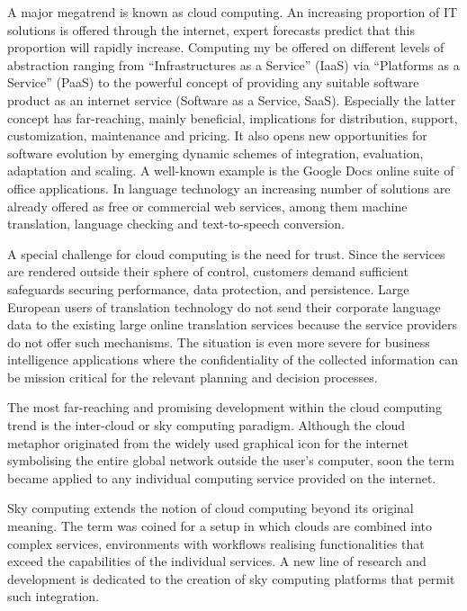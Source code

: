 \documentclass[10pt, plain]{../../metanetpaper}
\begin{document}
\begin{multicols}{2}
A major megatrend is known as cloud computing. An increasing proportion of IT solutions is offered through the internet, expert forecasts predict that this proportion will rapidly increase. Computing my be offered on different levels of abstraction ranging from “Infrastructures as a Service” (IaaS) via “Platforms as a Service” (PaaS) to the powerful concept of providing any suitable software product as an internet service (Software as a Service, SaaS). Especially the latter concept has far-reaching, mainly beneficial, implications for distribution, support, customization, maintenance and pricing. It also opens new opportunities for software evolution by emerging dynamic schemes of integration, evaluation, adaptation and scaling. A well-known example is the Google Docs online suite of office applications. In language technology an increasing number of solutions are already offered as free or commercial web services, among them machine translation, language checking and text-to-speech conversion.

A special challenge for cloud computing is the need for trust. Since the services are rendered outside their sphere of control, customers demand sufficient safeguards securing performance, data protection, and persistence. Large European users of translation technology do not send their corporate language data to the existing large online translation services because the service providers do not offer such mechanisms. The situation is even more severe for business intelligence applications where the confidentiality of the collected information can be mission critical for the relevant planning and decision processes.  

The most far-reaching and promising development within the cloud computing trend is the inter-cloud or sky computing paradigm. Although the cloud metaphor originated from the widely used graphical icon for the internet symbolising the entire global network outside the user’s computer, soon the term became applied to any individual computing service provided on the internet.  

Sky computing extends the notion of cloud computing beyond its original meaning. The term was coined for a setup in which clouds are combined into complex services, environments with workflows realising functionalities that exceed the capabilities of the individual services. A new line of research and development is dedicated to the creation of sky computing platforms that permit such integration.


\end{multicols}
\end{document}
